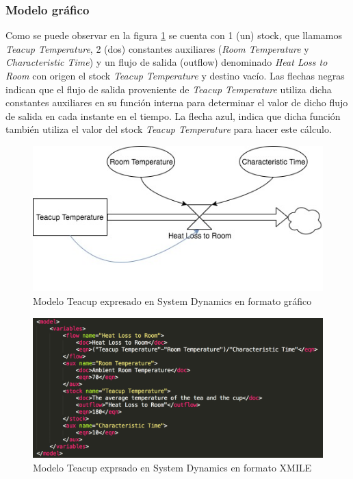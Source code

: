 \subsubsection{Modelo gráfico}
Como se puede observar en la figura \ref{fig:Teacup_sd} se cuenta con 1 (un) stock, que llamamos \textit{Teacup Temperature}, 2 (dos) constantes auxiliares (\textit{Room Temperature} y \textit{Characteristic Time}) y un flujo de salida (outflow) denominado \textit{Heat Loss to Room} con origen el stock \textit{Teacup Temperature} y destino vacío. Las flechas negras indican que el flujo de salida proveniente de \textit{Teacup Temperature} utiliza dicha constantes auxiliares en su función interna para determinar el valor de dicho flujo de salida en cada instante en el tiempo. La flecha azul, indica que dicha función también utiliza el valor del stock \textit{Teacup Temperature} para hacer este cálculo. 
\begin{figure}[!h]
\centering
\includegraphics[scale=0.5]{imagenes/Teacup_sd.jpg}
\caption{Modelo Teacup expresado en System Dynamics en formato gráfico}
\label{fig:Teacup_sd}
\end{figure}

\begin{figure}[!h]
\centering
\includegraphics[scale=0.5]{imagenes/teacup_mapeo/Teacup_variables}
\caption{Modelo Teacup exprsado en System Dynamics en formato XMILE}
\label{fig:Teacup_xmile}
\end{figure}

